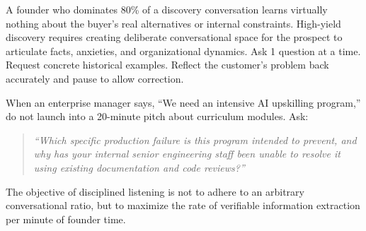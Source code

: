 A founder who dominates 80\% of a discovery conversation learns virtually nothing about the buyer's real alternatives or internal constraints. High-yield discovery requires creating deliberate conversational space for the prospect to articulate facts, anxieties, and organizational dynamics. Ask 1 question at a time. Request concrete historical examples. Reflect the customer's problem back accurately and pause to allow correction.

When an enterprise manager says, ``We need an intensive AI upskilling program,'' do not launch into a 20-minute pitch about curriculum modules. Ask:
\begin{quote}
\textit{``Which specific production failure is this program intended to prevent, and why has your internal senior engineering staff been unable to resolve it using existing documentation and code reviews?''}
\end{quote}
The objective of disciplined listening is not to adhere to an arbitrary conversational ratio, but to maximize the rate of verifiable information extraction per minute of founder time.
